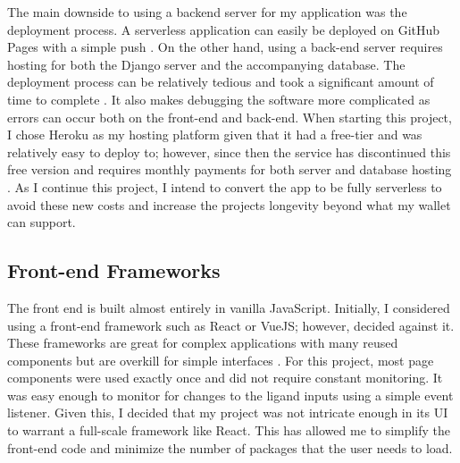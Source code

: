 \documentclass[10pt,twocolumn]{article}
\begin{document}
The main downside to using a backend server for my application was the deployment process. A serverless application can easily be deployed on GitHub Pages with a simple push \cite{githubpages}. On the other hand, using a back-end server requires hosting for both the Django server and the accompanying database. The deployment process can be relatively tedious and took a significant amount of time to complete \cite{deploying_django}. It also makes debugging the software more complicated as errors can occur both on the front-end and back-end. When starting this project, I chose Heroku as my hosting platform given that it had a free-tier and was relatively easy to deploy to; however, since then the service has discontinued this free version and requires monthly payments for both server and database hosting \cite{heroku_removal_of_free_tier}. As I continue this project, I intend to convert the app to be fully serverless to avoid these new costs and increase the projects longevity beyond what my wallet can support.

\subsection{Front-end Frameworks}
The front end is built almost entirely in vanilla JavaScript. Initially, I considered using a front-end framework such as React or VueJS; however, decided against it. These frameworks are great for complex applications with many reused components but are overkill for simple interfaces \cite{react}. For this project, most page components were used exactly once and did not require constant monitoring. It was easy enough to monitor for changes to the ligand inputs using a simple event listener. Given this, I decided that my project was not intricate enough in its UI to warrant a full-scale framework like React. This has allowed me to simplify the front-end code and minimize the number of packages that the user needs to load. 
\end{document}
